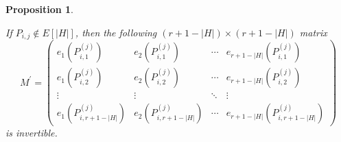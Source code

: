 \documentclass[journal,12pt,onecolumn]{IEEEtran}
\newtheorem{proposition}{Proposition}
\begin{document}
\begin{proposition}
\begin{itemize}
\[        \]
        If \(P_{i,j}\notin E[|H|]\), then the following \( (r + 1 - |H|) \times (r + 1 - |H|) \) matrix 
        \[
            M^\prime=\begin{pmatrix}
            e_1(P_{i,1}^{(j)}) & e_2(P_{i,1}^{(j)}) & \cdots & e_{r + 1 -|H|}(P_{i,1}^{(j)}) \\
            e_1(P_{i,2}^{(j)}) & e_2(P_{i,2}^{(j)}) & \cdots & e_{r + 1 -|H|}(P_{i,2}^{(j)}) \\
            \vdots & \vdots & \ddots & \vdots \\
            e_1(P_{i,r+1 - |H|}^{(j)}) & e_2(P_{i,r+1 - |H|}^{(j)}) & \cdots & e_{r + 1 -|H|}(P_{i,r+1 - |H|}^{(j)})
            \end{pmatrix}
        \]
        is invertible. 
    \end{itemize}
\end{proposition}
\end{document}
